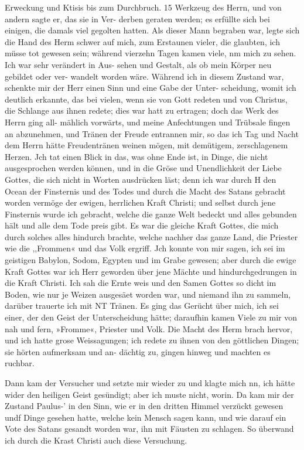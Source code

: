 Erweckung und Ktisis bis zum Durchbruch. 15
Werkzeug des Herrn, und von andern sagte er, das sie in Ver-
derben geraten werden; es erfüllte sich bei einigen, die damals
viel gegolten hatten. Als dieser Mann begraben war, legte sich
die Hand des Herm schwer auf mich, zum Erstaunen vieler, die
glaubten, ich müsse tot gewesen sein; während vierzehn Tagen
kamen viele, nm mich zu sehen. Ich war sehr verändert in Aus-
sehen und Gestalt, als ob mein Körper neu gebildet oder ver-
wandelt worden wäre. Während ich in diesem Zustand war,
schenkte mir der Herr einen Sinn und eine Gabe der Unter-
scheidung, womit ich deutlich erkannte, das bei vielen, wenn sie
von Gott redeten und von Christus, die Schlange aus ihnen redete;
dies war hatt zu ertragen; doch das Werk des Herrn ging all-
mählich vorwärts, und meine Anfechtungen und Trübsale fingen
an abzunehmen, und Tränen der Freude entrannen mir, so das
ich Tag und Nacht dem Herrn hätte Freudentränen weinen mögen,
mit demütigem, zerschlagenem Herzen. Jch tat einen Blick in das,
was ohne Ende ist, in Dinge, die nicht ausgesprochen werden
können, und in die Gröse und Unendlichkeit der Liebe Gottes,
die sich nicht in Worten ausdrücken läst; denn ich war durch H
den Ocean der Finsternis und des Todes und durch die Macht
des Satans gebracht worden vermöge der ewigen, herrlichen Kraft
Christi; und selbst durch jene Finsternis wurde ich gebracht, welche
die ganze Welt bedeckt und alles gebunden hält und alle dem Tode
preis gibt. Es war die gleiche Kraft Gottes, die mich durch
solches alles hindurch brachte, welche nachher das ganze Land,
die Priester wie die ,,Frommen« und das Volk ergriff.
Jch konnte von mir sagen, ich sei im geistigen Babylon, Sodom,
Egypten und im Grabe gewesen; aber durch die ewige Kraft Gottes
war ich Herr geworden über jene Mächte und hindurchgedrungen
in die Kraft Christi. Ich sah die Ernte weis und den Samen
Gottes so dicht im Boden, wie nur je Weizen ausgesäet worden
war, und niemand ihn zu sammeln, darüber trauerte ich mit NT
Tränen.
Es ging das Gerücht über mich, ich sei einer, der den Geist
der Unterscheidung hätte; daraufhin kamen Viele zu mir von nah
und fern, »Fromme«, Priester und Volk. Die Macht des Herm
brach hervor, und ich hatte grose Weissagungen; ich redete zu
ihnen von den göttlichen Dingen; sie hörten aufmerksam und an-
dächtig zu, gingen hinweg und machten es ruchbar.


Dann kam der Versucher und setzte mir wieder zu und
klagte mich nn, ich hätte wider den heiligen Geist gesündigt; aber
ich muste nicht, worin. Da kam mir der Zustand Paulus-’ in
den Sinn, wie er in den dritten Himmel verzückt gewesen undf
Dinge gesehen hatte, welche kein Mensch sagen kann, und wie
darauf ein Vote des Satans gesandt worden war, ihn mit
Fäusten zu schlagen. So überwand ich durch die Krast Christi
auch diese Versuchung.

